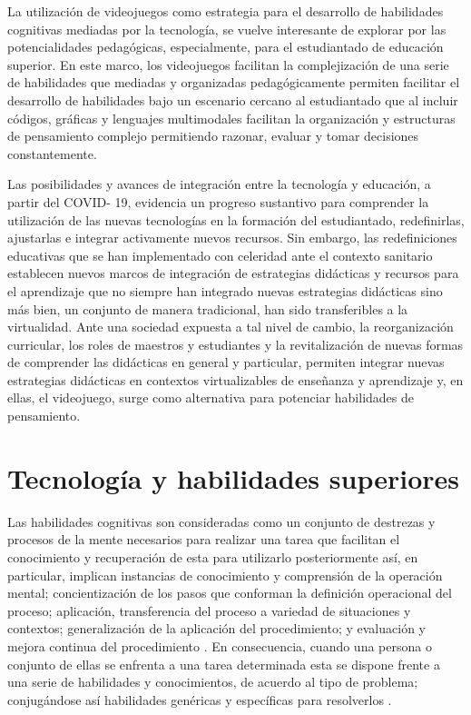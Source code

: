 \documentclass[spanish]{textolivre}
\begin{document}
La utilización de videojuegos como estrategia para el desarrollo de habilidades cognitivas mediadas por la tecnología, se vuelve interesante de explorar por las potencialidades pedagógicas, especialmente, para el estudiantado de educación superior. En este marco, los videojuegos facilitan la complejización de una serie de habilidades que mediadas y organizadas pedagógicamente permiten facilitar el desarrollo de habilidades bajo un escenario cercano al estudiantado que al incluir códigos, gráficas y lenguajes multimodales facilitan la organización y estructuras de pensamiento complejo permitiendo razonar, evaluar y tomar decisiones constantemente.

Las posibilidades y avances de integración entre la tecnología y educación, a partir del COVID- 19, evidencia un progreso sustantivo para comprender la utilización de las nuevas tecnologías en la formación del estudiantado, redefinirlas, ajustarlas e integrar activamente nuevos recursos. Sin embargo, las redefiniciones educativas que se han implementado con celeridad ante el contexto sanitario establecen nuevos marcos de integración de estrategias didácticas y recursos para el aprendizaje que no siempre han integrado nuevas estrategias didácticas sino más bien, un conjunto de manera tradicional, han sido transferibles a la virtualidad. Ante una sociedad expuesta a tal nivel de cambio, la reorganización curricular, los roles de maestros y estudiantes y la revitalización de nuevas formas de comprender las didácticas en general y particular, permiten integrar nuevas estrategias didácticas en contextos virtualizables de enseñanza y aprendizaje y, en ellas, el videojuego, surge como alternativa para potenciar habilidades de pensamiento.

\section{Tecnología y habilidades superiores}\label{techab}

Las habilidades cognitivas son consideradas como un conjunto de destrezas y procesos de la mente necesarios para realizar una tarea que facilitan el conocimiento y recuperación de esta para utilizarlo posteriormente \cite{ramos2010} %
así, en particular, implican instancias de conocimiento y comprensión de la operación mental; concientización de los pasos que conforman la definición operacional del proceso; aplicación, transferencia del proceso a variedad de situaciones y contextos; generalización de la aplicación del procedimiento; y evaluación y mejora continua del procedimiento \cite{sanchez2002}. %
En consecuencia, cuando una persona o conjunto de ellas se enfrenta a una tarea determinada esta se dispone frente a una serie de habilidades y conocimientos, de acuerdo al tipo de problema; conjugándose así habilidades genéricas y específicas para resolverlos \cite{pozo1994}.%
\end{document}
